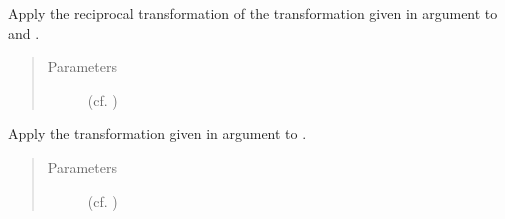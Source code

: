 \documentclass[letterpaper,10pt,english]{sphinxmanual}
\begin{document}
\begin{fulllineitems}

\begin{fulllineitems}
\label{\detokenize{index:Generator.Generator.decode_memory_with_transfo}}
Apply the reciprocal transformation of the transformation given in argument to  and .
\begin{quote}\begin{description}
\item[{Parameters}] \leavevmode
{} (cf. {\hyperref[\detokenize{index:module-Transforms}]{}}) \textendash{} 

\end{description}\end{quote}

\end{fulllineitems}


\begin{fulllineitems}
\label{\detokenize{index:Generator.Generator.encode_memory_with_current_transfo}}
\end{fulllineitems}


\begin{fulllineitems}
\label{\detokenize{index:Generator.Generator.encode_memory_with_transfo}}
Apply the transformation given in argument to .
\begin{quote}\begin{description}
\item[{Parameters}] \leavevmode
{} (cf. {\hyperref[\detokenize{index:module-Transforms}]{}}) \textendash{} 

\end{description}\end{quote}

\end{fulllineitems}


\end{fulllineitems}
\end{document}
